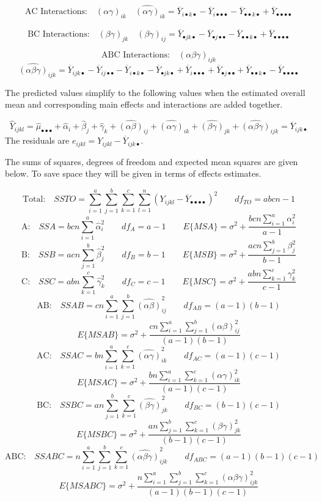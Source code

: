 \documentclass[
]{book}
\begin{document}
\[
\mbox{AC Interactions:} \quad (\alpha\gamma)_{ik} \quad
\hat{(\alpha\gamma)}_{ik}=
\overline{Y}_{i\bullet k\bullet} -
\overline{Y}_{i\bullet\bullet\bullet} -
\overline{Y}_{\bullet\bullet k\bullet} +
\overline{Y}_{\bullet\bullet\bullet\bullet}
\]

\[
\mbox{BC Interactions:} \quad (\beta\gamma)_{jk} \quad
\hat{(\beta\gamma)}_{ij}=
\overline{Y}_{\bullet jk\bullet} -
\overline{Y}_{\bullet j\bullet\bullet} -
\overline{Y}_{\bullet\bullet k\bullet} +
\overline{Y}_{\bullet\bullet\bullet\bullet}
\]

\[
\mbox{ABC Interactions:} \quad (\alpha\beta\gamma)_{ijk}
\] \[
\hat{(\alpha\beta\gamma)}_{ijk}=
\overline{Y}_{ijk\bullet} -
\overline{Y}_{ij\bullet \bullet} -
\overline{Y}_{i\bullet k\bullet} -
\overline{Y}_{\bullet jk\bullet} +
\overline{Y}_{i\bullet\bullet\bullet} +
\overline{Y}_{\bullet j\bullet\bullet} +
\overline{Y}_{\bullet\bullet k\bullet} -
\overline{Y}_{\bullet\bullet\bullet\bullet}
\]

The predicted values simplify to the following values when the estimated
overall mean and corresponding main effects and interactions are added
together.

\[
\hat{Y}_{ijkl} = \hat{\mu}_{\bullet\bullet\bullet} +
\hat{\alpha}_i + \hat{\beta}_j + \hat{\gamma}_k
+\hat{(\alpha\beta)}_{ij}+\hat{(\alpha\gamma)}_{ik}+
\hat{(\beta\gamma)}_{jk} + \hat{(\alpha\beta\gamma)}_{ijk}=
\overline{Y}_{ijk\bullet}
\] The residuals are \(e_{ijkl}=Y_{ijkl}-\overline{Y}_{ijk\bullet}\).

The sums of squares, degrees of freedom and expected mean squares are
given below. To save space they will be given in terms of effects
estimates.

\[
\mbox{Total:} \quad SSTO=
\sum_{i=1}^a\sum_{j=1}^b\sum_{k=1}^c\sum_{l=1}^n
\left(Y_{ijkl}-\overline{Y}_{\bullet\bullet\bullet\bullet}\right)^2
\qquad df_{TO}=abcn-1
\] \[
\mbox{A:} \quad SSA=bcn\sum_{i=1}^a \hat{\alpha}_i^2 \qquad df_A=a-1 
\qquad E\{MSA\}=\sigma^2 + \frac{bcn\sum_{i=1}^a\alpha_i^2}{a-1}
\] \[
\mbox{B:} \quad SSB=acn\sum_{j=1}^b \hat{\beta}_j^2 \qquad df_B=b-1 
\qquad E\{MSB\}=\sigma^2 + \frac{acn\sum_{j=1}^b\beta_j^2}{b-1}
\] \[
\mbox{C:} \quad SSC=abn\sum_{k=1}^c \hat{\gamma}_k^2 \qquad df_C=c-1 
\qquad E\{MSC\}=\sigma^2 + \frac{abn\sum_{k=1}^c\gamma_k^2}{c-1}
\] \[
\mbox{AB:} \quad SSAB=cn\sum_{i=1}^a\sum_{j=1}^b \hat{(\alpha\beta)}_{ij}^2 \qquad df_{AB}=(a-1)(b-1) 
\] \[
E\{MSAB\}=\sigma^2 + 
\frac{cn\sum_{i=1}^a\sum_{j=1}^b(\alpha\beta)_{ij}^2}{(a-1)(b-1)}
\] \[
\mbox{AC:} \quad SSAC=bn\sum_{i=1}^a\sum_{k=1}^c \hat{(\alpha\gamma)}_{ik}^2 \qquad df_{AC}=(a-1)(c-1) 
\] \[
E\{MSAC\}=\sigma^2 + 
\frac{bn\sum_{i=1}^a\sum_{k=1}^c(\alpha\gamma)_{ik}^2}{(a-1)(c-1)}
\] \[
\mbox{BC:} \quad SSBC=an\sum_{j=1}^b\sum_{k=1}^c \hat{(\beta\gamma)}_{jk}^2 \qquad df_{BC}=(b-1)(c-1) 
\] \[
E\{MSBC\}=\sigma^2 + 
\frac{an\sum_{j=1}^b\sum_{k=1}^c(\beta\gamma)_{jk}^2}{(b-1)(c-1)}
\] \[
\mbox{ABC:} \quad SSABC=n\sum_{i=1}^a\sum_{j=1}^b\sum_{k=1}^c \hat{(\alpha\beta\gamma)}_{ijk}^2 \qquad df_{ABC}=(a-1)(b-1)(c-1) 
\] \[
E\{MSABC\}=\sigma^2 + 
\frac{n\sum_{i=1}^a\sum_{j=1}^b\sum_{k=1}^c
(\alpha\beta\gamma)_{ijk}^2}{(a-1)(b-1)(c-1)}
\]
\end{document}
